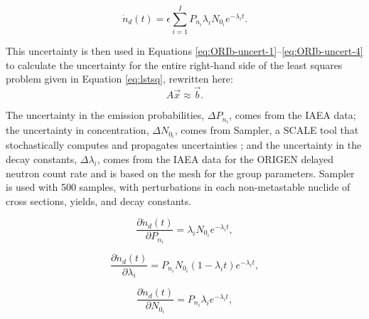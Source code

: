 \documentclass{style/nseJournal}
\begin{document}
\begin{equation}
\dot{n}_d(t) = \epsilon \sum_{i=1}^{I} P_{n_i} \lambda_i N_{0_i} e^{-\lambda_i t}.
\nonumber
\end{equation}

This uncertainty is then used in Equations \eqref{eq:ORIb-uncert-1}--\eqref{eq:ORIb-uncert-4} to calculate the uncertainty for the entire right-hand side of the least squares problem given in Equation \eqref{eq:lstsq}, rewritten here:
\begin{equation}
A \vec{x} \approx \vec{b}.
\nonumber
\end{equation}

The uncertainty in the emission probabilities, $\Delta P_{n_i}$, comes from the IAEA data; the uncertainty in concentration, $\Delta N_{0_i}$, comes from Sampler, a SCALE tool that stochastically computes and propagates uncertainties \cite{wieselquist_scale_2023}; and the uncertainty in the decay constants, $\Delta \lambda_{i}$, comes from the IAEA data for the ORIGEN delayed neutron count rate and is based on the mesh for the group parameters. Sampler is used with 500 samples, with perturbations in each non-metastable nuclide of cross sections, yields, and decay constants.



\begin{equation}
\frac{\partial \dot{n}_d(t)}{\partial P_{n_i}} = \lambda_i N_{0_i} e^{-\lambda_i t} ,
\label{eq:ORI-uncert-1}
\end{equation}

\begin{equation}
\frac{\partial \dot{n}_d(t)}{\partial \lambda_{i}} = P_{n_i} N_{0_i} (1-\lambda_i t) e^{-\lambda_i t} ,
\label{eq:ORI-uncert-2}
\end{equation}

\begin{equation}
\frac{\partial \dot{n}_d(t)}{\partial N_{0_i}} = P_{n_i} \lambda_i e^{-\lambda_i t} ,
\label{eq:ORI-uncert-3}
\end{equation}
\end{document}
